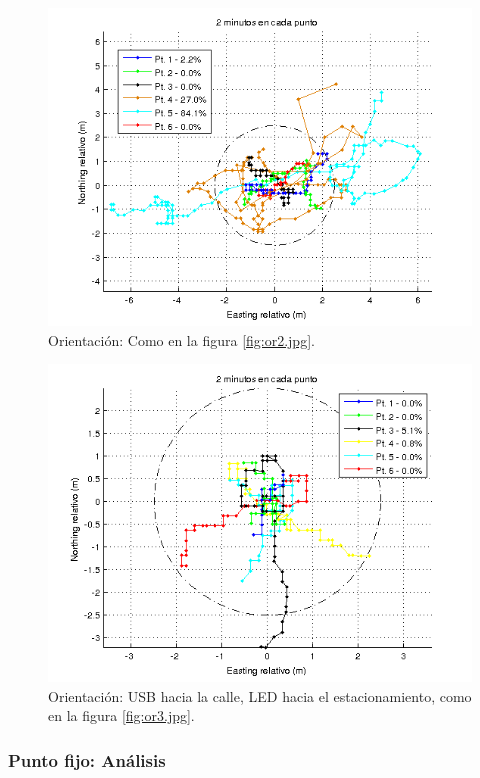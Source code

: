 \documentclass[spanish,12pt,a4paper,titlepage]{report}
\begin{document}
\newpage
\begin{figure}[h!]
  \includegraphics[width=1\textwidth]{./img/or2_todos_cut.png}
  \caption{Orientación: Como en la figura \ref{fig:or2.jpg}.}
\vspace{-30pt}
  \label{fig:or2_todos_cut.png}
\end{figure}

\begin{figure}[h!]
  \includegraphics[width=.9\textwidth]{./img/or3_todos.png}
  \caption{Orientación: USB hacia la calle, LED hacia el estacionamiento, como en la figura \ref{fig:or3.jpg}.}
  \label{fig:or3_todos.png}
\end{figure}

\newpage
\subsubsection{Punto fijo: Análisis}
\label{sec:gps2-punto-fijo-conclusiones}
\end{document}
